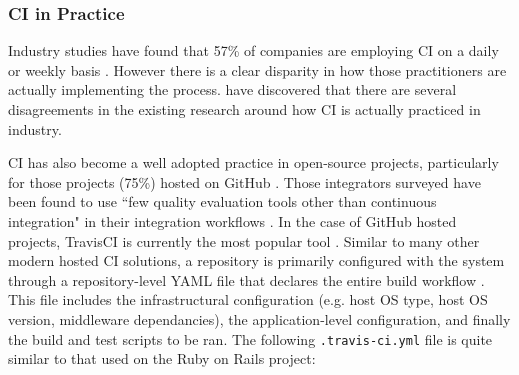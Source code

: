 \documentclass{report}
\begin{document}
\subsubsection{CI in Practice}
Industry studies have found that 57\% of companies are employing
CI on a daily or weekly basis \citep{Forrester}. However there is a clear disparity in how those
practitioners are actually implementing the process. \citet{Stahl} have 
discovered that there are several disagreements in the existing research around how CI is actually practiced in industry. 
\par
CI has also become a well adopted practice in open-source projects,
particularly for those projects (75\%) hosted on GitHub \citep{Gous}. Those integrators surveyed 
have been found to use ``few quality evaluation tools other than
continuous integration" in their integration workflows \citep{Gous}. 
In the case of GitHub hosted projects, 
TravisCI is currently the most popular tool \citep{Yu}. Similar to many other
modern hosted CI solutions, a repository is primarily configured 
with the system through a repository-level YAML file that declares the entire build workflow  \citep{Santos}.
This file includes the infrastructural configuration (e.g. host OS type, host OS version, middleware dependancies), the application-level configuration, and finally the build and test scripts to be ran. The following \texttt{.travis-ci.yml} file is quite
similar to that used on the Ruby on Rails project:
\end{document}
